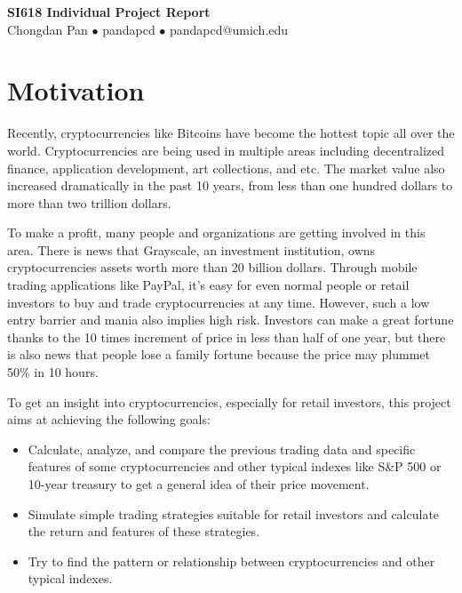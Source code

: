 \documentclass[a4paper]{article}
\begin{document}
\begin{center}
    \Large{\textbf{SI618 Individual Project Report}}\\
    \large{Chongdan Pan $\bullet$ pandapcd $\bullet$ pandapcd@umich.edu}
\end{center}
\section{Motivation}
Recently, cryptocurrencies like Bitcoins have become the hottest topic all over the world. Cryptocurrencies are being used in multiple areas including decentralized finance, application development, art collections, and etc. The market value also increased dramatically in the past 10 years, from less than one hundred dollars to more than two trillion dollars.

\par To make a profit, many people and organizations are getting involved in this area. There is news that Grayscale, an investment institution, owns cryptocurrencies assets worth more than 20 billion dollars. Through mobile trading applications like PayPal, it’s easy for even normal people or retail investors to buy and trade cryptocurrencies at any time. However, such a low entry barrier and mania also implies high risk. Investors can make a great fortune thanks to the 10 times increment of price in less than half of one year, but there is also news that people lose a family fortune because the price may plummet 50\% in 10 hours.

\par To get an insight into cryptocurrencies, especially for retail investors, this project aims at achieving the following goals:
\begin{itemize}
    \item Calculate, analyze, and compare the previous trading data and specific features of some cryptocurrencies and other typical indexes like S\&P 500 or 10-year treasury to get a general idea of their price movement.
    \item Simulate simple trading strategies suitable for retail investors and calculate the return and features of these strategies.
    \item Try to find the pattern or relationship between cryptocurrencies and other typical indexes.
\end{itemize}
\end{document}

